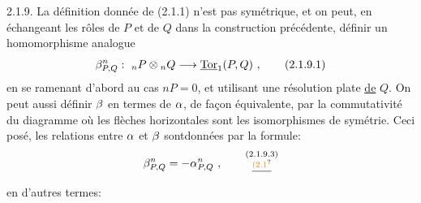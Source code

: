 2.1.9. La définition donnée de (2.1.1) n'est pas symétrique, et on peut, en échangeant les rôles de $P$ et de $Q$ dans la construction précédente, définir un homomorphisme analogue
\[
\handwritten{\beta^n_{P,Q}}:\ {}_nP\otimes{}_nQ\handwritten{\longrightarrow}\underline{\mathrm{Tor}}_1(P,Q)\ ,\tag*{(2.1.9.1)}
\]
en se ramenant d'abord au cas $nP=0$, et utilisant une résolution plate \uline{de} $Q$. On peut aussi définir $\beta$ en termes de $\alpha$, de façon équivalente, par la commutativité du diagramme
où les flèches horizontales sont les isomorphismes de symétrie. Ceci posé, les relations entre $\alpha$ et $\beta$ sont\handwritten{/}données par la formule:
\[
\handwritten{\beta}^{n}_{P,Q}=-{\handwritten{\alpha}}^{n}_{P,Q}\ ,\tag*{\(\substack{\text{(2.1.9.3)}\\\deleted{\text{\unsure{(2.1}}}}\)}
\]
en d'autres termes:


